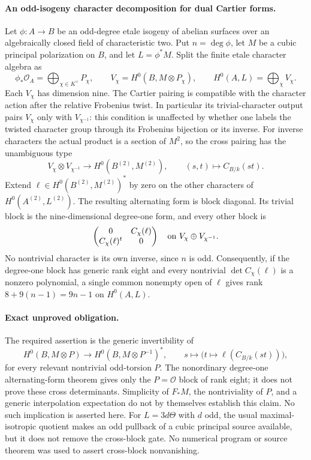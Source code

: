 \paragraph{An odd-isogeny character decomposition for dual Cartier forms.}
Let $\phi:A\to B$ be an odd-degree etale isogeny of abelian surfaces
over an algebraically closed field of characteristic two. Put
$n=\deg\phi$, let $M$ be a cubic principal polarization on $B$, and
let $L=\phi^*M$. Split the finite etale character algebra as
\[
\phi_*\mathcal O_A=\bigoplus_{\chi\in K^\vee}P_\chi,
\qquad V_\chi=H^0(B,M\otimes P_\chi),\qquad
H^0(A,L)=\bigoplus_\chi V_\chi.
\]
Each $V_\chi$ has dimension nine. The Cartier pairing is compatible
with the character action after the relative Frobenius twist. In
particular its trivial-character output pairs $V_\chi$ only with
$V_{\chi^{-1}}$: this condition is unaffected by whether one labels
the twisted character group through its Frobenius bijection or its
inverse. For inverse characters the actual product is a section of
$M^2$, so the cross pairing has the unambiguous type
\[
V_\chi\otimes V_{\chi^{-1}}
 \longrightarrow H^0(B^{(2)},M^{(2)}),\qquad
(s,t)\longmapsto C_{B/k}(st).
\]
Extend $\ell\in H^0(B^{(2)},M^{(2)})^*$ by zero on the other
characters of $H^0(A^{(2)},L^{(2)})$. The resulting alternating
form is block diagonal. Its trivial block is the nine-dimensional
degree-one form, and every other block is
\[
\begin{pmatrix}0&C_\chi(\ell)\\
C_\chi(\ell)^t&0\end{pmatrix}
\quad\hbox{on }V_\chi\oplus V_{\chi^{-1}}.
\]
No nontrivial character is its own inverse, since $n$ is odd.
Consequently, if the degree-one block has generic rank eight and
every nontrivial $\det C_\chi(\ell)$ is a nonzero polynomial, a
single common nonempty open of $\ell$ gives rank
$8+9(n-1)=9n-1$ on $H^0(A,L)$.

\paragraph{Exact unproved obligation.}
The required assertion is the generic invertibility of
\[
H^0(B,M\otimes P)\longrightarrow
H^0(B,M\otimes P^{-1})^*,\qquad
s\longmapsto\bigl(t\mapsto\ell(C_{B/k}(st))\bigr),
\]
for every relevant nontrivial odd-torsion $P$. The nonordinary
degree-one alternating-form theorem gives only the $P=\mathcal O$
block of rank eight; it does not prove these cross determinants.
Simplicity of $F_*M$, the nontriviality of $P$, and a generic
interpolation expectation do not by themselves establish this
claim. No such implication is asserted here. For $L=3d\Theta$
with $d$ odd, the usual maximal-isotropic quotient makes an odd
pullback of a cubic principal source available, but it does not
remove the cross-block gate. No numerical program or source
theorem was used to assert cross-block nonvanishing.
